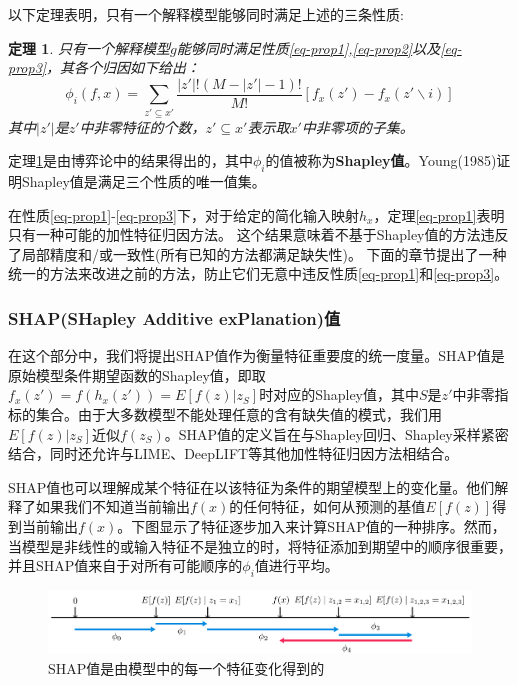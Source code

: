 \documentclass[12pt, a4paper, oneside]{ctexart}
\newtheorem{theorem}{定理}[section] %
\numberwithin{equation}{section}  %
\begin{document}
以下定理表明，只有一个解释模型能够同时满足上述的三条性质:
\begin{theorem}\label{theo-shapley}
    只有一个解释模型$g$能够同时满足性质\ref{eq-prop1},\ref{eq-prop2}以及\ref{eq-prop3}，其各个归因如下给出：
    \begin{equation}
\phi_i(f,x) = \sum_{z'\subseteq x'}\frac{|z'|!(M-|z'|-1)!}{M!}[f_x(z')-f_x(z'\backslash i)]
    \end{equation}
其中$|z'|$是$z'$中非零特征的个数，$z'\subseteq x'$表示取$x'$中非零项的子集。
\end{theorem}
定理\ref{theo-shapley}是由博弈论中的结果得出的，其中$\phi_i$的值被称为\textbf{Shapley值}。Young(1985)证明Shapley值是满足三个性质的唯一值集。


在性质\ref{eq-prop1}-\ref{eq-prop3}下，对于给定的简化输入映射$h_x$，定理\ref{eq-prop1}表明只有一种可能的加性特征归因方法。
这个结果意味着不基于Shapley值的方法违反了局部精度和/或一致性(所有已知的方法都满足缺失性)。
下面的章节提出了一种统一的方法来改进之前的方法，防止它们无意中违反性质\ref{eq-prop1}和\ref{eq-prop3}。
\subsubsection{SHAP(SHapley Additive exPlanation)值}
在这个部分中，我们将提出SHAP值作为衡量特征重要度的统一度量。SHAP值是原始模型条件期望函数的Shapley值，即取$f_x(z')=f(h_x(z'))=E[f(z)|z_S]$时对应的Shapley值，其中$S$是$z'$中非零指标的集合。由于大多数模型不能处理任意的含有缺失值的模式，我们用$E[f(z)|z_S]$近似$f(z_S)$。SHAP值的定义旨在与Shapley回归、Shapley采样紧密结合，同时还允许与LIME、DeepLIFT等其他加性特征归因方法相结合。

SHAP值也可以理解成某个特征在以该特征为条件的期望模型上的变化量。他们解释了如果我们不知道当前输出$f(x)$的任何特征，如何从预测的基值$E[f(z)]$得到当前输出$f(x)$。下图显示了特征逐步加入来计算SHAP值的一种排序。然而，当模型是非线性的或输入特征不是独立的时，将特征添加到期望中的顺序很重要，并且SHAP值来自于对所有可能顺序的$\phi_i$值进行平均。
\begin{figure}[htbp]
    \centering
    \includegraphics[width=\textwidth]{SHAP理论解释}
    \caption{SHAP值是由模型中的每一个特征变化得到的}
\end{figure}
\end{document}
